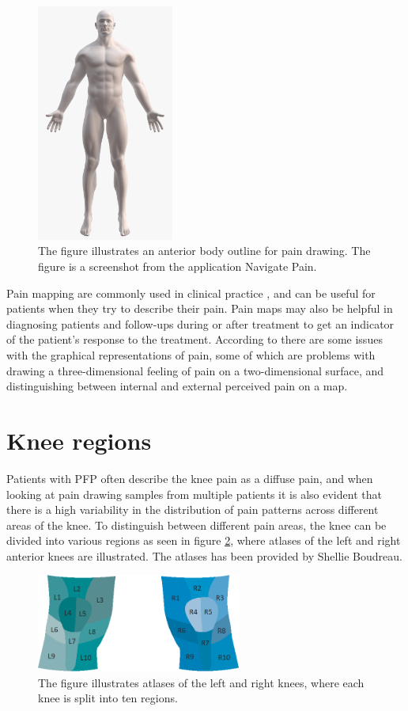 \begin{figure} [H]
\centering
\includegraphics[width=0.4\textwidth]{figures/painmap}
\caption{The figure illustrates an anterior body outline for pain drawing. The figure is a screenshot from the application Navigate Pain.}
\label{fig:painmap}
\end{figure}

Pain mapping are commonly used in clinical practice \citep{Schott2010}, and can be useful for patients when they try to describe their pain. Pain maps may also be helpful in diagnosing patients and follow-ups during or after treatment to get an indicator of the patient’s response to the treatment.\citep{Boudreau2016}
According to \citeauthor{Schott2010} there are some issues with the graphical representations of pain, some of which are problems with drawing a three-dimensional feeling of pain on a two-dimensional surface, and distinguishing between internal and external perceived pain on a map.\citep{Schott2010}

\section{Knee regions}
Patients with PFP often describe the knee pain as a diffuse pain, and when looking at pain drawing samples from multiple patients it is also evident that there is a high variability in the distribution of pain patterns across different areas of the knee. 
To distinguish between different pain areas, the knee can be divided into various regions as seen in figure \ref{fig:atlas}, where atlases of the left and right anterior knees are illustrated. The atlases has been provided by Shellie Boudreau. 

\begin{figure} [H]
\centering
\includegraphics[width=0.6\textwidth]{figures/atlas}
\caption{The figure illustrates atlases of the left and right knees, where each knee is split into ten regions.}
\label{fig:atlas}
\end{figure}

\newpage